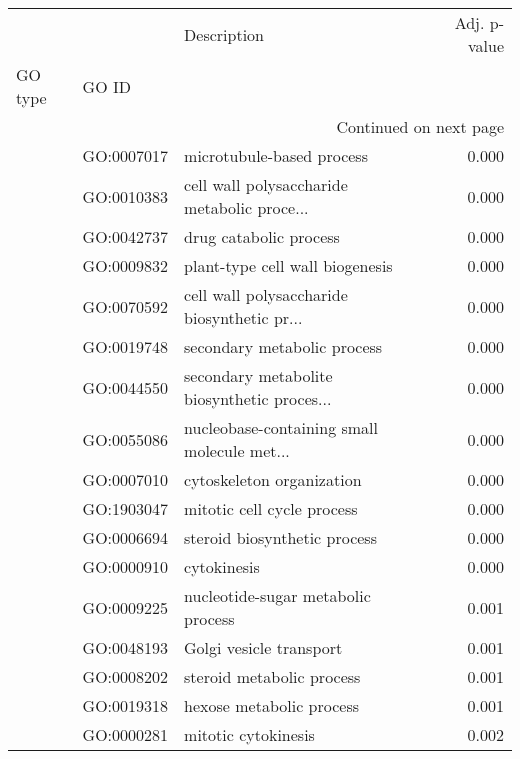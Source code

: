 \begin{longtable}{lllr}
\toprule
   &            &                                  Description &  Adj. p-value \\
GO type & GO ID &                                              &               \\
\midrule
\endhead
\midrule
\multicolumn{4}{r}{{Continued on next page}} \\
\midrule
\endfoot

\bottomrule
\endlastfoot
\multirow{194}{*}{BP} & GO:0007017 &                    microtubule-based process &         0.000 \\
   & GO:0010383 &  cell wall polysaccharide metabolic proce... &         0.000 \\
   & GO:0042737 &                       drug catabolic process &         0.000 \\
   & GO:0009832 &              plant-type cell wall biogenesis &         0.000 \\
   & GO:0070592 &  cell wall polysaccharide biosynthetic pr... &         0.000 \\
   & GO:0019748 &                  secondary metabolic process &         0.000 \\
   & GO:0044550 &  secondary metabolite biosynthetic proces... &         0.000 \\
   & GO:0055086 &  nucleobase-containing small molecule met... &         0.000 \\
   & GO:0007010 &                    cytoskeleton organization &         0.000 \\
   & GO:1903047 &                   mitotic cell cycle process &         0.000 \\
   & GO:0006694 &                 steroid biosynthetic process &         0.000 \\
   & GO:0000910 &                                  cytokinesis &         0.000 \\
   & GO:0009225 &           nucleotide-sugar metabolic process &         0.001 \\
   & GO:0048193 &                      Golgi vesicle transport &         0.001 \\
   & GO:0008202 &                    steroid metabolic process &         0.001 \\
   & GO:0019318 &                     hexose metabolic process &         0.001 \\
   & GO:0000281 &                          mitotic cytokinesis &         0.002 \\

\end{longtable}
